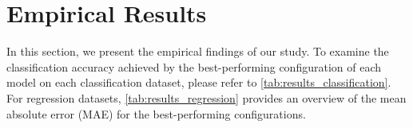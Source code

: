 \cleardoubleoddstandardpage
\chapter{Empirical Results}\label{sec:emprical_results}
In this section, we present the empirical findings of our study. To examine the classification accuracy achieved by the best-performing configuration of each model on each classification dataset, please refer to \cref{tab:results_classification}. For regression datasets, \cref{tab:results_regression} provides an overview of the mean absolute error (MAE) for the best-performing configurations.

\begin{table}[!b]
	\centering
	\caption{Overview of the mean classification accuracies achieved by the best configuration of each model for each dataset in percent and standard deviation. We highlighted the best accuracy for the \wlnn and \gnn models for each dataset.}
	\label{tab:results_classification}
\end{table}
